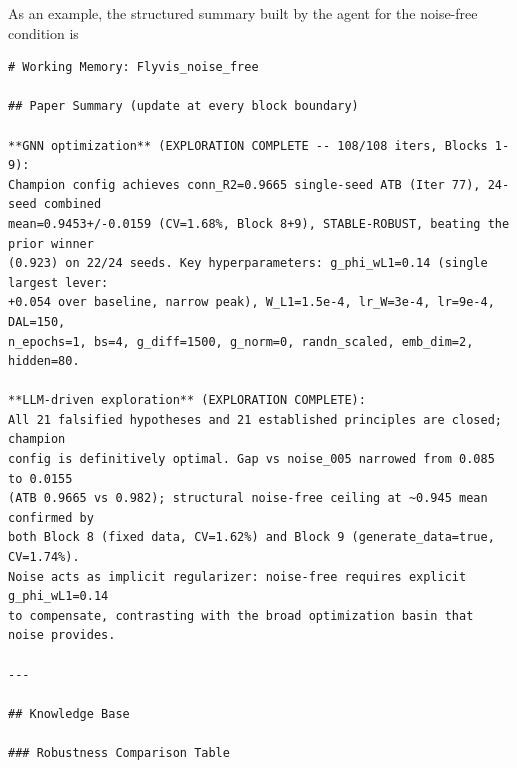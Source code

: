 \documentclass{article}
\begin{document}
As an example, the structured summary built by the agent for the
noise-free condition is

\begin{tiny}
\begin{verbatim}
# Working Memory: Flyvis_noise_free

## Paper Summary (update at every block boundary)

**GNN optimization** (EXPLORATION COMPLETE -- 108/108 iters, Blocks 1-9):
Champion config achieves conn_R2=0.9665 single-seed ATB (Iter 77), 24-seed combined
mean=0.9453+/-0.0159 (CV=1.68%, Block 8+9), STABLE-ROBUST, beating the prior winner
(0.923) on 22/24 seeds. Key hyperparameters: g_phi_wL1=0.14 (single largest lever:
+0.054 over baseline, narrow peak), W_L1=1.5e-4, lr_W=3e-4, lr=9e-4, DAL=150,
n_epochs=1, bs=4, g_diff=1500, g_norm=0, randn_scaled, emb_dim=2, hidden=80.

**LLM-driven exploration** (EXPLORATION COMPLETE):
All 21 falsified hypotheses and 21 established principles are closed; champion
config is definitively optimal. Gap vs noise_005 narrowed from 0.085 to 0.0155
(ATB 0.9665 vs 0.982); structural noise-free ceiling at ~0.945 mean confirmed by
both Block 8 (fixed data, CV=1.62%) and Block 9 (generate_data=true, CV=1.74%).
Noise acts as implicit regularizer: noise-free requires explicit g_phi_wL1=0.14
to compensate, contrasting with the broad optimization basin that noise provides.

---

## Knowledge Base

### Robustness Comparison Table


\end{verbatim}
\end{tiny}
\end{document}
